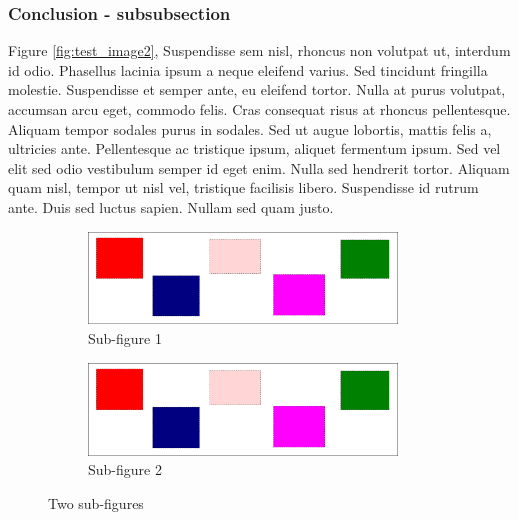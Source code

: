 \subsubsection{Conclusion - subsubsection}
Figure \ref{fig:test_image2}, Suspendisse sem nisl, rhoncus non volutpat ut,
interdum id odio. Phasellus lacinia ipsum a neque eleifend varius. Sed
tincidunt fringilla molestie.  Suspendisse et semper ante, eu eleifend tortor.
Nulla at purus volutpat, accumsan arcu eget, commodo felis. Cras consequat
risus at rhoncus pellentesque. Aliquam tempor sodales purus in sodales. Sed ut
augue lobortis, mattis felis a, ultricies ante. Pellentesque ac tristique
ipsum, aliquet fermentum ipsum. Sed vel elit sed odio vestibulum semper id eget
enim. Nulla sed hendrerit tortor. Aliquam quam nisl, tempor ut nisl vel,
tristique facilisis libero. Suspendisse id rutrum ante. Duis sed luctus sapien.
Nullam sed quam justo.
\begin{figure}[h]
    \begin{subfigure}[b]{0.5\linewidth}
        \centering
            \includegraphics[width=0.9\textwidth]{figures/test_image}
            \caption{Sub-figure 1}
            \label{fig:subfig1}
            \end{subfigure}%
        \begin{subfigure}[b]{.5\linewidth}
            \centering
            \includegraphics[width=0.9\textwidth]{figures/test_image}
            \caption{Sub-figure 2}
            \label{fig:subfig2}
        \end{subfigure}
    \caption{Two sub-figures}
\label{fig:sub-figures}
\end{figure}

